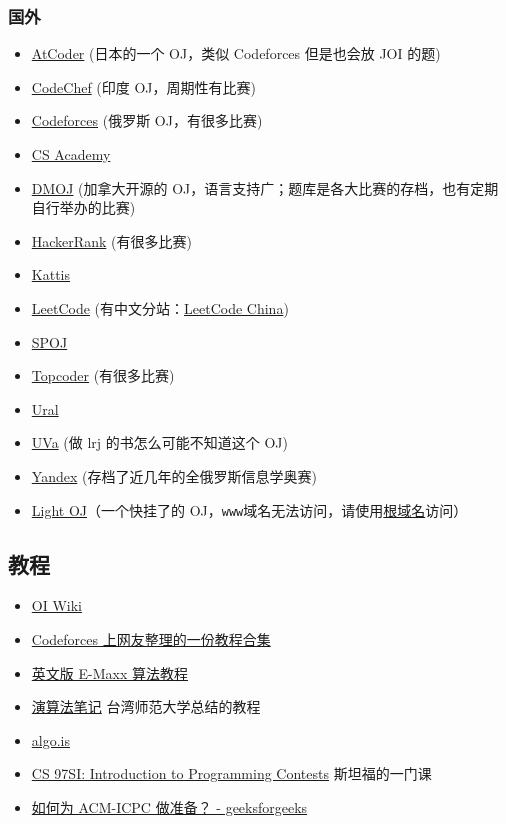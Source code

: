 \subsubsection{国外}

\begin{itemize}
\item \href{https://atcoder.jp/}{AtCoder} (日本的一个 OJ，类似 Codeforces 但是也会放 JOI 的题)
\item \href{https://codechef.com/}{CodeChef} (印度 OJ，周期性有比赛)
\item \href{https://codeforces.com/}{Codeforces} (俄罗斯 OJ，有很多比赛)
\item \href{https://csacademy.com/}{CS Academy}
\item \href{https://dmoj.ca/}{DMOJ} (加拿大开源的 OJ，语言支持广；题库是各大比赛的存档，也有定期自行举办的比赛)
\item \href{https://www.hackerrank.com/}{HackerRank} (有很多比赛)
\item \href{https://open.kattis.com/}{Kattis}
\item \href{https://leetcode.com/}{LeetCode} (有中文分站：\href{https://leetcode-cn.com/}{LeetCode China})
\item \href{http://www.spoj.com}{SPOJ}
\item \href{https://www.topcoder.com/}{Topcoder} (有很多比赛)
\item \href{http://acm.timus.ru/}{Ural}
\item \href{https://uva.onlinejudge.org/}{UVa} (做 lrj 的书怎么可能不知道这个 OJ)
\item \href{https://contest.yandex.ru/}{Yandex} (存档了近几年的全俄罗斯信息学奥赛)
\item \href{http://lightoj.com}{Light OJ}（一个快挂了的 OJ，\texttt{www}域名无法访问，请使用\href{http://lightoj.com}{根域名}访问）
\end{itemize}

\subsection{教程}

\begin{itemize}
\item \href{https://oi-wiki.org}{OI Wiki}
\item \href{http://codeforces.com/blog/entry/57282}{Codeforces 上网友整理的一份教程合集}
\item \href{https://cp-algorithms.com/}{英文版 E-Maxx 算法教程}
\item \href{http://www.csie.ntnu.edu.tw/~u91029/}{演算法笔记} 台湾师范大学总结的教程
\item \href{https://algo.is/t-414-aflv-competitive-programming-course-2016/}{algo.is}
\item \href{http://web.stanford.edu/class/cs97si/}{CS 97SI: Introduction to Programming Contests} 斯坦福的一门课
\item \href{https://www.geeksforgeeks.org/how-to-prepare-for-acm-icpc/}{如何为 ACM-ICPC 做准备？ - geeksforgeeks}
\end{itemize}

